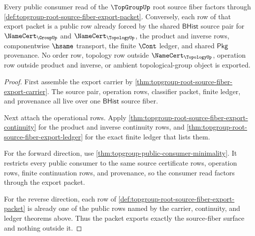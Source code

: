 \begin{theorem}
\label{thm:topgroup-root-source-fiber-export-consumer-boundary}
Every public consumer read of the $\TopGroupUp$ root source fiber factors
through \autoref{def:topgroup-root-source-fiber-export-packet}. Conversely,
each row of that export packet is a public row already forced by the shared
$\mathsf{BHist}$ source pair for $\NameCert_{\GroupUp}$ and
$\NameCert_{\TopologyUp}$, the product and inverse rows, componentwise
$\hsame$ transport, the finite $\Cont$ ledger, and shared $\mathsf{Pkg}$
provenance. No order row, topology row outside $\NameCert_{\TopologyUp}$,
operation row outside product and inverse, or ambient topological-group object
is exported.
\end{theorem}
\begin{proof}
First assemble the export carrier by
\autoref{thm:topgroup-root-source-fiber-export-carrier}. The source pair,
operation rows, classifier packet, finite ledger, and provenance all live over
one $\mathsf{BHist}$ source fiber.

Next attach the operational rows. Apply
\autoref{thm:topgroup-root-source-fiber-export-continuity} for the product and
inverse continuity rows, and
\autoref{thm:topgroup-root-source-fiber-export-ledger} for the exact finite
ledger that lists them.

For the forward direction, use
\autoref{thm:topgroup-public-consumer-minimality}. It restricts every public
consumer to the same source certificate rows, operation rows, finite
continuation rows, and provenance, so the consumer read factors through the
export packet.

For the reverse direction, each row of
\autoref{def:topgroup-root-source-fiber-export-packet} is already one of the
public rows named by the carrier, continuity, and ledger theorems above. Thus
the packet exports exactly the source-fiber surface and nothing outside it.
\end{proof}


